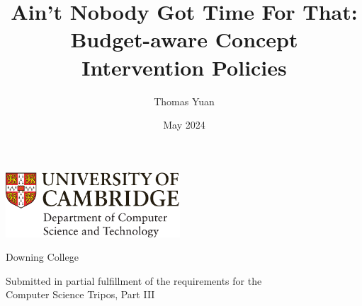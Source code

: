 \documentclass[12pt,a4paper,twoside]{report}
\title{Ain't Nobody Got Time For That: Budget-aware Concept Intervention Policies}
\author{Thomas Yuan}
\date{May 2024}
\newif\ifsubmission %
\newcommand{\candidatenumber}{1234N}
\newcommand{\college}{Downing College}
\newcommand{\course}{Computer Science Tripos, Part III}
\begin{document}

\begin{sffamily} %

\begin{titlepage}
\makeatletter

\hspace*{-14mm}\includegraphics[width=65mm]{logo-dcst-colour}

\ifsubmission

\begin{Large}
\vspace{20mm}
Research project report title page

\vspace{35mm}
Candidate \candidatenumber

\vspace{42mm}
\textsl{``\@title''}

\end{Large}

\else

\begin{center}
\Huge
\vspace{\fill}

\@title
\vspace{\fill}

\@author
\vspace{10mm}

\Large
\college
\vspace{\fill}

\@date
\vspace{\fill}

\end{center}

\fi

\vspace{\fill}
\begin{center}
Submitted in partial fulfillment of the requirements for the\\
\course
\end{center}

\makeatother
\end{titlepage}


\end{sffamily}
\end{document}
